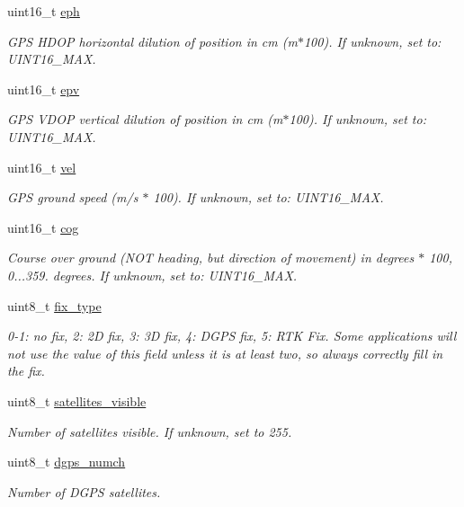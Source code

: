 \begin{DoxyCompactItemize}
uint16\+\_\+t \hyperlink{struct____mavlink__gps2__raw__t_a332355622e75f6041e6bd8fd516b7039}{eph}
\begin{DoxyCompactList}\small\item\em G\+P\+S H\+D\+O\+P horizontal dilution of position in cm (m$\ast$100). If unknown, set to\+: U\+I\+N\+T16\+\_\+\+M\+A\+X. \end{DoxyCompactList}\item 
uint16\+\_\+t \hyperlink{struct____mavlink__gps2__raw__t_abe56b345d635dfc3ad3b4b8a3a28ea90}{epv}
\begin{DoxyCompactList}\small\item\em G\+P\+S V\+D\+O\+P vertical dilution of position in cm (m$\ast$100). If unknown, set to\+: U\+I\+N\+T16\+\_\+\+M\+A\+X. \end{DoxyCompactList}\item 
uint16\+\_\+t \hyperlink{struct____mavlink__gps2__raw__t_a9e5043757c692dbb795727869976ab17}{vel}
\begin{DoxyCompactList}\small\item\em G\+P\+S ground speed (m/s $\ast$ 100). If unknown, set to\+: U\+I\+N\+T16\+\_\+\+M\+A\+X. \end{DoxyCompactList}\item 
uint16\+\_\+t \hyperlink{struct____mavlink__gps2__raw__t_a1bac9f4f74dff39a5f1b4e3767734b21}{cog}
\begin{DoxyCompactList}\small\item\em Course over ground (N\+O\+T heading, but direction of movement) in degrees $\ast$ 100, 0...359. degrees. If unknown, set to\+: U\+I\+N\+T16\+\_\+\+M\+A\+X. \end{DoxyCompactList}\item 
uint8\+\_\+t \hyperlink{struct____mavlink__gps2__raw__t_a96227427865925b915a8bc067adfed2a}{fix\+\_\+type}
\begin{DoxyCompactList}\small\item\em 0-\/1\+: no fix, 2\+: 2\+D fix, 3\+: 3\+D fix, 4\+: D\+G\+P\+S fix, 5\+: R\+T\+K Fix. Some applications will not use the value of this field unless it is at least two, so always correctly fill in the fix. \end{DoxyCompactList}\item 
uint8\+\_\+t \hyperlink{struct____mavlink__gps2__raw__t_a162bb84f09a8ee280da65b979bc87742}{satellites\+\_\+visible}
\begin{DoxyCompactList}\small\item\em Number of satellites visible. If unknown, set to 255. \end{DoxyCompactList}\item 
uint8\+\_\+t \hyperlink{struct____mavlink__gps2__raw__t_ac6a3259c7b17d851e240898945a63df7}{dgps\+\_\+numch}
\begin{DoxyCompactList}\small\item\em Number of D\+G\+P\+S satellites. \end{DoxyCompactList}\end{DoxyCompactItemize}



